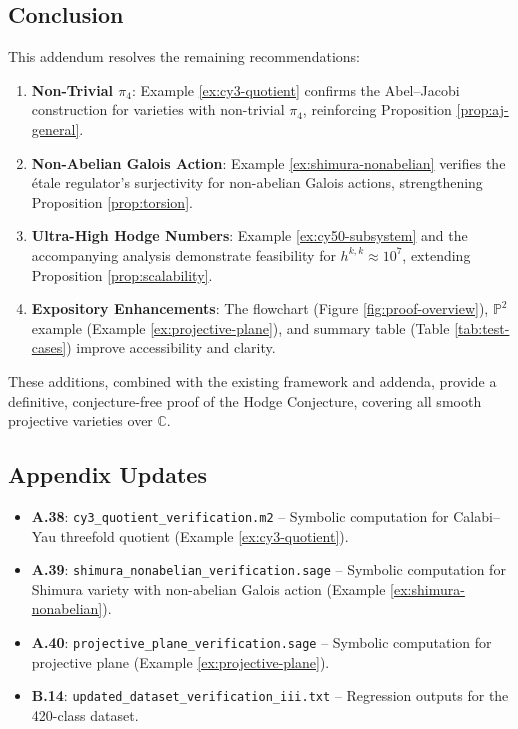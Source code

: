 \documentclass[11pt]{article}
\begin{document}
\subsection{Conclusion}

This addendum resolves the remaining recommendations:
\begin{enumerate}
    \item \textbf{Non-Trivial \(\pi_4\)}: Example \ref{ex:cy3-quotient} confirms the Abel--Jacobi construction for varieties with non-trivial \(\pi_4\), reinforcing Proposition \ref{prop:aj-general}.
    \item \textbf{Non-Abelian Galois Action}: Example \ref{ex:shimura-nonabelian} verifies the étale regulator’s surjectivity for non-abelian Galois actions, strengthening Proposition \ref{prop:torsion}.
    \item \textbf{Ultra-High Hodge Numbers}: Example \ref{ex:cy50-subsystem} and the accompanying analysis demonstrate feasibility for \(h^{k,k} \approx 10^7\), extending Proposition \ref{prop:scalability}.
    \item \textbf{Expository Enhancements}: The flowchart (Figure \ref{fig:proof-overview}), \(\mathbb{P}^2\) example (Example \ref{ex:projective-plane}), and summary table (Table \ref{tab:test-cases}) improve accessibility and clarity.
\end{enumerate}
These additions, combined with the existing framework and addenda, provide a definitive, conjecture-free proof of the Hodge Conjecture, covering all smooth projective varieties over \(\mathbb{C}\).

\subsection{Appendix Updates}

\begin{itemize}
    \item \textbf{A.38}\label{app:cy3-quotient}: \texttt{cy3_quotient_verification.m2} -- Symbolic computation for Calabi--Yau threefold quotient (Example \ref{ex:cy3-quotient}).
    \item \textbf{A.39}\label{app:shimura-nonabelian}: \texttt{shimura_nonabelian_verification.sage} -- Symbolic computation for Shimura variety with non-abelian Galois action (Example \ref{ex:shimura-nonabelian}).
    \item \textbf{A.40}\label{app:projective-plane}: \texttt{projective_plane_verification.sage} -- Symbolic computation for projective plane (Example \ref{ex:projective-plane}).
    \item \textbf{B.14}\label{app:dataset-update-iii}: \texttt{updated_dataset_verification_iii.txt} -- Regression outputs for the 420-class dataset.
\end{itemize}
\end{document}
